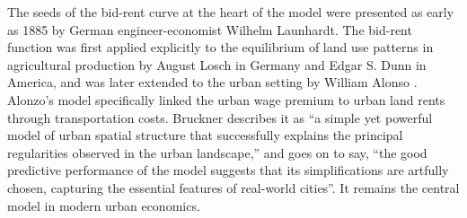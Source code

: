  The seeds of the bid-rent curve at the heart of the model were presented as early as 1885  by German engineer-economist Wilhelm Launhardt. \cite{blaugEconomicTheoryRetrospect1985, launhardtMathematischeBegruendungVolkswirthschaftslehre1885} The  \gls{bid-rent function} was first applied explicitly to the equilibrium of land use patterns in agricultural production by August Losch \cite{loschEconomicsLocation1954} in Germany and Edgar S. Dunn \cite{dunnEquilibriumLandUsePatterns1954} in America, and was later extended to the urban setting by William Alonso \cite{alonsoModelUrbanLand1960}. Alonzo's  model  specifically linked the urban wage premium to urban land rents through transportation costs.  Bruckner \cite{bruecknerStructureUrbanEquilibria1987} describes it as ``a simple yet powerful model of urban spatial structure that successfully explains the principal regularities observed in the urban landscape,'' and goes on to say, ``the good predictive performance of the model suggests that its simplifications are artfully chosen, capturing the essential features of real-world cities''. It remains the central model in modern urban economics.

